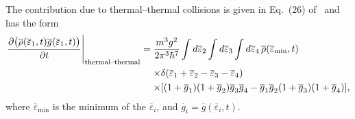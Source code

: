 The contribution due to thermal--thermal collisions is given in Eq.~(26) of~\citep{Bijlsma:2000} and has the form
\begin{align}
    \begin{split}
        \left. \frac{\partial\big(\overline{\rho}(\overline{\varepsilon}_1, t) \overline{g}(\overline{\varepsilon}_1, t)\big)}{\partial t}\right|_\text{thermal--thermal} &= \frac{m^3 g^2}{2 \pi^3 \hbar^7} \int d\overline{\varepsilon}_2 \int d\overline{\varepsilon}_3 \int d\overline{\varepsilon}_4 \,\overline{\rho}(\overline{\varepsilon}_\text{min}, t)\\
        &\relphantom{=} \times\delta(\overline{\varepsilon}_1 + \overline{\varepsilon}_2 - \overline{\varepsilon}_3 - \overline{\varepsilon}_4) \\
        &\relphantom{=} \times [ (1+\overline{g}_1) (1+\overline{g}_2) \overline{g}_3 \overline{g}_4 - \overline{g}_1 \overline{g}_2 (1+\overline{g}_3) (1+\overline{g}_4)],
    \end{split}
\end{align}
where $\overline{\varepsilon}_\text{min}$ is the minimum of the $\overline{\varepsilon}_i$, and $\overline{g}_i = \overline{g}(\overline{\varepsilon}_i, t)$. 

